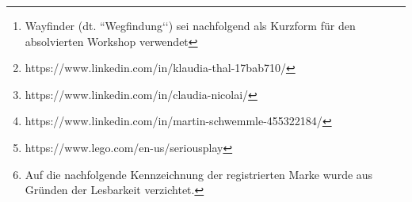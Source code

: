 \clearpage
\begin{abstract}
    Das Wayfinder Seminar\footnote{Wayfinder (dt. ``Wegfindung‘‘) sei nachfolgend als Kurzform für den absolvierten Workshop verwendet} ist ein an der Stanford University konzipierter Workshop, der unter der Leitung von Klaudia Thal\footnote{https://www.linkedin.com/in/klaudia-thal-17bab710/}, Dr. Claudia Nicolai\footnote{https://www.linkedin.com/in/claudia-nicolai/} und Dr. Martin Schwemmle\footnote{https://www.linkedin.com/in/martin-schwemmle-455322184/} im Sommer 2020 am Hasso-Plattner-Institut durchgeführt wurde. Ziel des Kurses war es, den Teilnehmenden bei der Erstellung ihrer Zukunftspläne und der allgemeinen Wegfindung zu helfen.
    Der Workshop fand aufgrund der gegenwärtigen Situation im remote Format statt. Daher mussten vor allem für das Prototypisieren der Zukunftspläne neue Konzepte entworfen werden. Hierbei setzte das Team der HPI DSchool auf die Methode Lego\textsuperscript{\textregistered} Serious Play\textsuperscript{\textregistered}\footnote{https://www.lego.com/en-us/seriousplay}\footnote{Auf die nachfolgende Kennzeichnung der registrierten Marke wurde aus Gründen der Lesbarkeit verzichtet. }.


    Diese Methode wird auf den folgenden Seiten im Kontext des Prototypings eingeführt und mit anderen Methoden verglichen. Darauf folgt eine Dokumentation der Anwendung dieser Methode im Wayfinder. Abschließend werden alternative Integrationsformen vorgestellt und die Anwendung der Methode in einer Diskussion abgeschlossen.

\end{abstract}